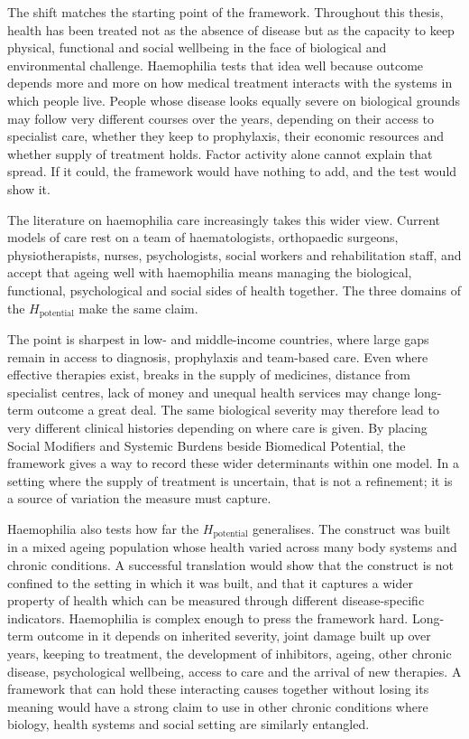 The shift matches the starting point of the framework. Throughout this thesis, health has been treated not as the absence of disease but as the capacity to keep physical, functional and social wellbeing in the face of biological and environmental challenge. Haemophilia tests that idea well because outcome depends more and more on how medical treatment interacts with the systems in which people live. People whose disease looks equally severe on biological grounds may follow very different courses over the years, depending on their access to specialist care, whether they keep to prophylaxis, their economic resources and whether supply of treatment holds. Factor activity alone cannot explain that spread. If it could, the framework would have nothing to add, and the test would show it.

The literature on haemophilia care increasingly takes this wider view. Current models of care rest on a team of haematologists, orthopaedic surgeons, physiotherapists, nurses, psychologists, social workers and rehabilitation staff, and accept that ageing well with haemophilia means managing the biological, functional, psychological and social sides of health together. The three domains of the $H_{\text{potential}}$ make the same claim.

The point is sharpest in low- and middle-income countries, where large gaps remain in access to diagnosis, prophylaxis and team-based care. Even where effective therapies exist, breaks in the supply of medicines, distance from specialist centres, lack of money and unequal health services may change long-term outcome a great deal. The same biological severity may therefore lead to very different clinical histories depending on where care is given. By placing Social Modifiers and Systemic Burdens beside Biomedical Potential, the framework gives a way to record these wider determinants within one model. In a setting where the supply of treatment is uncertain, that is not a refinement; it is a source of variation the measure must capture.

Haemophilia also tests how far the $H_{\text{potential}}$ generalises. The construct was built in a mixed ageing population whose health varied across many body systems and chronic conditions. A successful translation would show that the construct is not confined to the setting in which it was built, and that it captures a wider property of health which can be measured through different disease-specific indicators. Haemophilia is complex enough to press the framework hard. Long-term outcome in it depends on inherited severity, joint damage built up over years, keeping to treatment, the development of inhibitors, ageing, other chronic disease, psychological wellbeing, access to care and the arrival of new therapies. A framework that can hold these interacting causes together without losing its meaning would have a strong claim to use in other chronic conditions where biology, health systems and social setting are similarly entangled.

